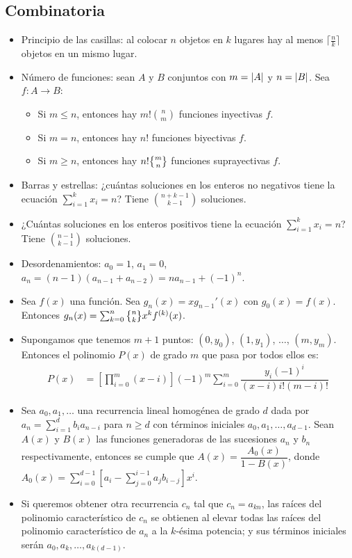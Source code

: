 	\subsection{Combinatoria}
		\begin{itemize}
			\item Principio de las casillas: al colocar $n$ objetos en $k$ lugares hay al menos $\lceil \frac{n}{k} \rceil$ objetos en un mismo lugar.
			\item Número de funciones: sean $A$ y $B$ conjuntos con $m=\left|A\right|$ y $n=\left|B\right|$. Sea $f : A \to B$:
			\begin{itemize}
				\item Si $m \leq n$, entonces hay $\displaystyle m!\binom{n}{m}$ funciones inyectivas $f$.
				\item Si $m=n$, entonces hay $n!$ funciones biyectivas $f$.
				\item Si $m \geq n$, entonces hay $n!\stirlingII{m}{n}$ funciones suprayectivas $f$.
			\end{itemize}
			\item Barras y estrellas: ¿cuántas soluciones en los enteros no negativos tiene la ecuación $\displaystyle \sum_{i=1}^{k}x_i = n$? Tiene  $\displaystyle \binom{n+k-1}{k-1}$ soluciones.
			\item ¿Cuántas soluciones en los enteros positivos tiene la ecuación $\displaystyle \sum_{i=1}^{k}x_i = n$? Tiene  $\displaystyle \binom{n-1}{k-1}$ soluciones.
			\item Desordenamientos: $a_0=1$, $a_1=0$, $a_n=(n-1)(a_{n-1}+a_{n-2})=na_{n-1}+(-1)^n$.
			\item Sea $f(x)$ una función. Sea $g_n(x)=x g_{n-1}'(x)$ con $g_0(x)=f(x)$. Entonces $g_n(x)=\sum_{k=0}^{n} \stirlingII{n}{k} x^k f^{(k)}(x)$.
			\item Supongamos que tenemos $m+1$ puntos: $(0, y_0)$, $(1, y_1)$, $\ldots$, $(m, y_m)$. Entonces el polinomio $P(x)$ de grado $m$ que pasa por todos ellos es:
			\begin{align*}
				P(x) &= \left[ \prod_{i=0}^{m}(x-i) \right] (-1)^m \sum_{i=0}^{m} \dfrac{y_i (-1)^i}{(x-i)i!(m-i)!}
			\end{align*}
			\item Sea $a_0, a_1, \ldots$ una recurrencia lineal homogénea de grado $d$ dada por $\displaystyle a_n=\sum_{i=1}^{d} b_i a_{n-i}$ para $n \geq d$ con términos iniciales $a_0, a_1, \ldots, a_{d-1}$. Sean $A(x)$ y $B(x)$ las funciones generadoras de las sucesiones $a_n$ y $b_n$ respectivamente, entonces se cumple que $A(x)=\dfrac{A_0(x)}{1-B(x)}$, donde $\displaystyle A_0(x)=\sum_{i=0}^{d-1} \left[ a_i - \sum_{j=0}^{i-1}a_j b_{i-j} \right] x^i$.
			\item Si queremos obtener otra recurrencia $c_n$ tal que $c_n=a_{kn}$, las raíces del polinomio característico de $c_n$ se obtienen al elevar todas las raíces del polinomio característico de $a_n$ a la $k$-ésima potencia; y sus términos iniciales serán $a_0, a_k, \ldots, a_{k(d-1)}$.
		\end{itemize}

